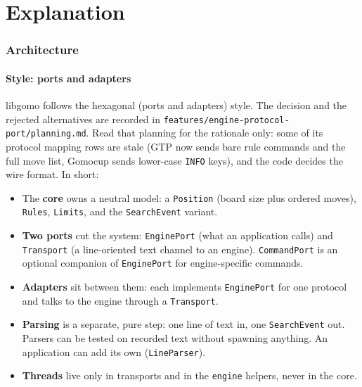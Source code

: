 \documentclass[11pt,a4paper]{article}
\newcommand{\code}[1]{\texttt{#1}}
\newcommand{\file}[1]{\texttt{#1}}
\begin{document}
\part{Explanation}

\section{Architecture}\label{sec:layers}

\subsection{Style: ports and adapters}

libgomo follows the hexagonal (ports and adapters) style. The decision and the rejected
alternatives are recorded in \file{features/engine-protocol-port/planning.md}. Read that planning
for the rationale only: some of its protocol mapping rows are stale (GTP now sends bare rule
commands and the full move list, Gomocup sends lower-case \code{INFO} keys), and the code decides
the wire format. In short:

\begin{itemize}
  \item The \textbf{core} owns a neutral model: a \code{Position} (board size plus ordered moves),
        \code{Rules}, \code{Limits}, and the \code{SearchEvent} variant.
  \item \textbf{Two ports} cut the system: \code{EnginePort} (what an application calls) and
        \code{Transport} (a line-oriented text channel to an engine). \code{CommandPort} is an
        optional companion of \code{EnginePort} for engine-specific commands.
  \item \textbf{Adapters} sit between them: each implements \code{EnginePort} for one protocol and
        talks to the engine through a \code{Transport}.
  \item \textbf{Parsing} is a separate, pure step: one line of text in, one \code{SearchEvent} out.
        Parsers can be tested on recorded text without spawning anything. An application can
        add its own (\code{LineParser}).
  \item \textbf{Threads} live only in transports and in the \code{engine} helpers, never in the
        core.
\end{itemize}
\end{document}
